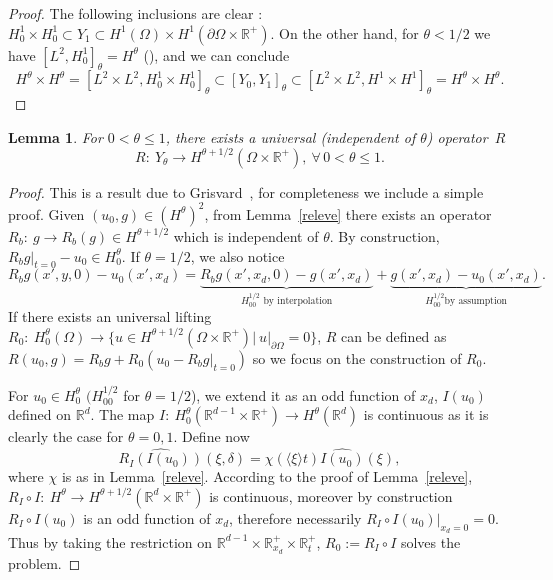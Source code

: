 \documentclass[10pt]{amsart}
\newtheorem{lemm}[theo]{Lemma}\newtheorem{prop}[theo]{Proposition}\newtheorem{coro}[theo]{Corollary}\newtheorem{conj}[theo]{Conjecture}
\theoremstyle{definition}\newtheorem{defi}[theo]{Definition}\newtheorem{rema}[theo]{Remark}\newtheorem{exam}[theo]{Example}\newtheorem{exem}[theo]{Example}\newtheorem{nota}[theo]{Notation}
\newcommand{\R}{\mathbb{R}}
\newcommand{\cxi}{\langle \xi\rangle}
\let\oldforall\forall
\renewcommand*{\forall}{\mathrel{\oldforall}}
\begin{document}
\begin{proof}
The following inclusions are clear : $H^1_0\times H^1_0\subset Y_1\subset H^1(\Omega)
\times H^1(\partial\Omega\times \R^+)$. On the other hand, for $\theta<1/2$ we have $[L^2,H^1_0]_\theta=H^\theta$ (\cite[Chapter~1 Section~11]{lionsmagenes}), and we can conclude
\[
H^\theta\times H^\theta=\left[L^2\times L^2,H^1_0\times H^1_0\right]_\theta\subset \left[Y_0,Y_1\right]_\theta\subset \left[L^2\times L^2,H^1\times H^1\right]_\theta= H^\theta\times H^\theta.
\]
\end{proof}

\begin{lemm}\label{relevecoin}
For $0<\theta\leq 1$, there exists a universal (independent of $\theta$) operator~$R$
\[
R:\ Y_\theta\to H^{\theta+1/2}(\Omega\times \R^+),\ \forall\, 0<\theta\leq 1.
\]
\end{lemm}


\begin{proof}
This is a result due to Grisvard~\cite{Grisvard}, for completeness we include a simple proof. Given $(u_0,g)\in (H^\theta)^2$, from Lemma~\ref{releve} there exists an operator $R_b:\ g\to R_b(g)\in H^{\theta+1/2}$ which is independent of $\theta$. By construction, $R_bg|_{t=0}-u_0\in H^\theta_0$. If $\theta=1/2$, we also notice
\[
R_bg(x',y,0)-u_0(x',x_d)=
\underbrace{R_bg(x',x_d,0)-g(x',x_d)}_{H^{1/2}_{00}\text{ by interpolation}} +\underbrace{g(x',x_d)-u_0(x',x_d)}_{H^{1/2}_{00}
\text{by assumption}}.
\]
If there exists an universal lifting $R_0:\ H^\theta_0(\Omega)\to \{u\in H^{\theta+1/2}(\Omega\times \R^+)|\ u|_{\partial\Omega}=0\}$, $R$ can be defined as $R(u_0,g)=R_bg+R_0(u_0-R_bg|_{t=0})$ so we focus on the construction of $R_0$.


For $u_0\in H^\theta_0$ $(H^{1/2}_{00}$ for $\theta=1/2$), we extend it as an odd function of $x_d$, $I(u_0)$ defined on $\R^d$. The map $I:\ H^\theta_0(\R^{d-1}\times \R^+)\to H^\theta(\R^d)$ is continuous as it is clearly the case for $\theta=0,1$. Define now
\[
\widehat{R_I(I(u_0))}(\xi,\delta)=\chi(\cxi t)\widehat{I(u_0)}(\xi),
\]
where $\chi$ is as in Lemma~\ref{releve}. According to the proof of Lemma~\ref{releve}, $R_I\circ I:\ H^\theta\to H^{\theta+1/2}(\R^d\times \R^+)$ is continuous, moreover by construction $R_I\circ I(u_0)$ is an odd function of $x_d$, therefore necessarily $R_I\circ I (u_0)|_{x_d=0}=0$. Thus by taking the restriction on $\R^{d-1}\times \R^+_{x_d}
\times \R_t^+$, $R_0:=R_I\circ I$ solves the problem.
\end{proof}
\end{document}
